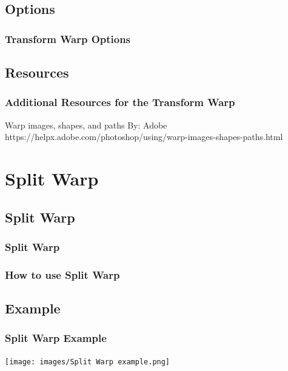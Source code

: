 \documentclass{beamer}
\begin{document}
\subsection{Options}		
	\begin{frame}
		\frametitle{Transform Warp Options}
		\begin{outline}
			\1 
		\end{outline}
	\end{frame}

\subsection{Resources}		
	\begin{frame}
		\frametitle{Additional Resources for the Transform Warp}
		\begin{outline}
			\1 Warp images, shapes, and paths
			\2 By:  Adobe
			\2 https://helpx.adobe.com/photoshop/using/warp-images-shapes-paths.html
		\end{outline}
	\end{frame}




\section{Split Warp}

\subsection{Split Warp}		

\begin{frame}
	\frametitle{Split Warp}
	\begin{outline}
		\1 
	\end{outline}
\end{frame}

	\begin{frame}
	\frametitle{How to use Split Warp}
	\begin{outline}
		\1 
	\end{outline}
\end{frame}

\subsection{Example}		
\begin{frame}
	\frametitle{Split Warp Example}
	\begin{center}
		\texttt{[image: images/Split Warp example.png]}
	\end{center}
\end{frame}
\end{document}
